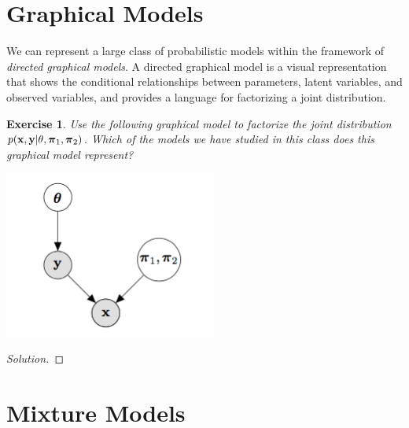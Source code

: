 \documentclass[12pt,letterpaper]{article}
\newtheorem{exercise}{Exercise}
\newenvironment{exercisesolution}
  {\begin{proof}[Solution]}
  {\end{proof}}
\begin{document}

\section{Graphical Models}
We can represent a large class of probabilistic models within the framework of \emph{directed graphical models}. A directed graphical model is a visual representation that shows the conditional relationships between parameters, latent variables, and observed variables, and provides a language for factorizing a joint distribution. 

\smallskip

\begin{exercise}
Use the following graphical model to factorize the joint distribution $p(\mathbf{x}, \mathbf{y} | \theta, \boldsymbol{\pi}_1, \boldsymbol{\pi}_2)$. Which of the models we have studied in this class does this graphical model represent? \\
\begin{center}
\includegraphics[width=7cm]{graphical_model}
\end{center}
\end{exercise}
\begin{exercisesolution}
\newpage

\end{exercisesolution}

\section{Mixture Models}
\end{document}
